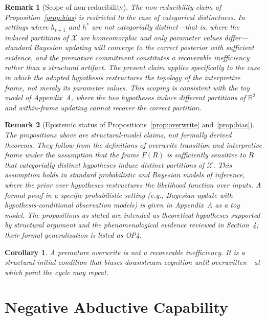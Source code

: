 \documentclass[12pt]{article}
\newtheorem{corollary}{Corollary}
\newtheorem{remark}{Remark}
\begin{document}
\begin{remark}[Scope of non-reducibility]
The non-reducibility claim of Proposition~\ref{prop:bias} is restricted
to the case of categorical distinctness. In settings where $h_{t+1}$
and $h^*$ are \emph{not} categorially distinct---that is, where the
induced partitions of $\mathcal{X}$ are homeomorphic and only parameter
values differ---standard Bayesian updating \emph{will} converge to the
correct posterior with sufficient evidence, and the premature commitment
constitutes a recoverable inefficiency rather than a structural artifact.
The present claim applies specifically to the case in which the adopted
hypothesis restructures the topology of the interpretive frame, not
merely its parameter values.
This scoping is consistent with the toy model of Appendix~A, where
the two hypotheses induce different partitions of $\mathbb{R}^2$ and
within-frame updating cannot recover the correct partition.
\end{remark}

\begin{remark}[Epistemic status of Propositions~\ref{prop:overwrite} and~\ref{prop:bias}]
The propositions above are structural-model claims, not formally derived
theorems. They follow from the definitions of overwrite transition and
interpretive frame under the assumption that the frame $F(R)$ is
sufficiently sensitive to $R$ that categorially distinct hypotheses
induce distinct partitions of $\mathcal{X}$. This assumption holds in
standard probabilistic and Bayesian models of inference, where the
prior over hypotheses restructures the likelihood function over inputs.
A formal proof in a specific probabilistic setting (e.g., Bayesian
update with hypothesis-conditional observation models) is given in
Appendix~A as a toy model. The propositions as stated are intended as
theoretical hypotheses supported by structural argument and the
phenomenological evidence reviewed in Section~4; their formal
generalization is listed as OP4.
\end{remark}

\begin{corollary}
A premature overwrite is not a recoverable inefficiency.
It is a structural initial condition that biases downstream cognition
until overwritten---at which point the cycle may repeat.
\end{corollary}

\section{Negative Abductive Capability}
\end{document}
